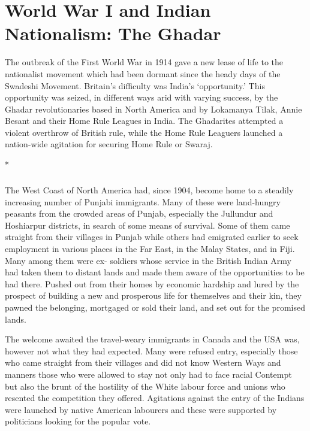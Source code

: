 
\chapter{World War I and Indian Nationalism: The Ghadar}

The outbreak of the First World War in 1914 gave a new lease of life to the nationalist movement which had been dormant since the heady days of the Swadeshi Movement. Britain's difficulty was India's `opportunity.' This opportunity was seized, in different ways arid with varying success, by the Ghadar revolutionaries based in North America and by Lokamanya Tilak, Annie Besant and their Home Rule Leagues in India. The Ghadarites attempted a violent overthrow of British rule, while the Home Rule Leaguers launched a nation-wide agitation for securing Home Rule or Swaraj.

\begin{center}*\end{center}

\paragraph*{}


The West Coast of North America had, since 1904, become home to a steadily increasing number of Punjabi immigrants. Many of these were land-hungry peasants from the crowded areas of Punjab, especially the Jullundur and Hoshiarpur districts, in search of some means of survival. Some of them came straight from their villages in Punjab while others had emigrated earlier to seek employment in various places in the Far East, in the Malay States, and in Fiji. Many among them were ex- soldiers whose service in the British Indian Army had taken them to distant lands and made them aware of the opportunities to be had there. Pushed out from their homes by economic hardship and lured by the prospect of building a new and prosperous life for themselves and their kin, they pawned the belonging, mortgaged or sold their land, and set out for the promised lands.

The welcome awaited the travel-weary immigrants in Canada and the USA was, however not what they had expected. Many were refused entry, especially those who came straight from their villages and did not know Western Ways and manners those who were allowed to stay not only had to face racial Contempt but also the brunt of the hostility of the White labour force and unions who resented the competition they offered. Agitations against the entry of the Indians were launched by native American labourers and these were supported by politicians looking for the popular vote.

